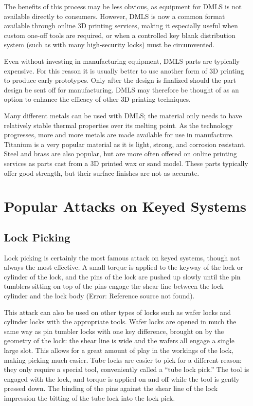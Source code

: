 \documentclass{acm_proc_article-sp}
\begin{document}
The benefits of this process may be less obvious, as equipment for DMLS is not available directly to consumers. However, DMLS is now a common format available through online 3D printing services, making it especially useful when custom one-off tools are required, or when a controlled key blank distribution system (such as with many high-security locks) must be circumvented.

Even without investing in manufacturing equipment, DMLS parts are typically expensive. For this reason it is usually better to use another form of 3D printing to produce early prototypes. Only after the design is finalized should the part design be sent off for manufacturing. DMLS may therefore be thought of as an option to enhance the efficacy of other 3D printing techniques.

Many different metals can be used with DMLS; the material only needs to have relatively stable thermal properties over its melting point. As the technology progresses, more and more metals are made available for use in manufacture. Titanium is a very popular material as it is light, strong, and corrosion resistant. Steel and brass are also popular, but are more often offered on online printing services as parts cast from a 3D printed wax or sand model. These parts typically offer good strength, but their surface finishes are not as accurate.

\section{Popular Attacks on Keyed Systems}
\subsection{Lock Picking}
Lock picking is certainly the most famous attack on keyed systems, though not always the most effective. A small torque is applied to the keyway of the lock or cylinder of the lock, and the pins of the lock are pushed up slowly until the pin tumblers sitting on top of the pins engage the shear line between the lock cylinder and the lock body (Error: Reference source not found).

This attack can also be used on other types of locks such as wafer locks and cylinder locks with the appropriate tools. Wafer locks are opened in much the same way as pin tumbler locks with one key difference, brought on by the geometry of the lock: the shear line is wide and the wafers all engage a single large slot. This allows for a great amount of play in the workings of the lock, making picking much easier. Tube locks are easier to pick for a different reason: they only require a special tool, conveniently called a ``tube lock pick.'' The tool is engaged with the lock, and torque is applied on and off while the tool is gently pressed down. The binding of the pins against the shear line of the lock impression the bitting of the tube lock into the lock pick.
\end{document}
